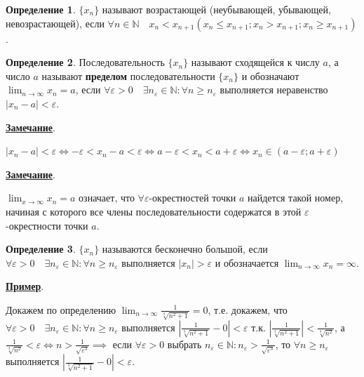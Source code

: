 \documentclass[a4paper,oneside]{article}
\newcommand{\parspace}{\vspace{10pt}}
\newcommand{\dslim}{\displaystyle\lim}
\newcommand{\dslimn}{\dslim_{n \to \infty}}
\theoremstyle{definition}
\newtheorem{definition}{Определение}[subsection]
\theoremstyle{definition}
\theoremstyle{definition}
\begin{document}
\begin{definition}
    $\{x_n\}$ называют возрастающей (неубывающей, убывающей, невозрастающей), если
    $\forall n \in \mathbb{N} \quad x_n < x_{n + 1} (x_n \le x_{n + 1}; x_n > x_{n + 1}; x_n \ge x_{n + 1})$.
\end{definition}

\begin{definition}
    Последовательность $\{x_n\}$ называют сходящейся к числу $a$, а число $a$ называют
    \textbf{пределом} последовательности $\{x_n\}$ и обозначают 
    $\displaystyle\lim_{n \rightarrow \infty} x_n = a$, если 
    $\forall \varepsilon > 0 \quad \exists n_\varepsilon \in \mathbb{N}: \forall n \ge n_\varepsilon$
    выполняется неравенство $|x_n - a| < \varepsilon$.
\end{definition}

\underline{\textbf{Замечание}}.

$|x_n - a| < \varepsilon \Leftrightarrow -\varepsilon < x_n - a < \varepsilon 
\Leftrightarrow a - \varepsilon < x_n < a + \varepsilon
\Leftrightarrow x_n \in (a - \varepsilon; a + \varepsilon)$

\parspace

\underline{\textbf{Замечание}}.

$\displaystyle\lim_{x \rightarrow \infty} x_n = a$ означает, что
$\forall \varepsilon$-окрестностей точки $a$ найдется такой номер, 
начиная с которого все члены последовательности содержатся в этой
$\varepsilon$-окрестности точки $a$.

\begin{definition}
    $\{x_n\}$ называются бесконечно большой, если
    $\forall \varepsilon > 0 \quad \exists n_\varepsilon \in \mathbb{N}:
    \forall n \ge n_\varepsilon$ выполняется $|x_n| > \varepsilon$ и
    обозначается $\dslimn x_n = \infty$.
\end{definition}

\parspace

\underline{\textbf{Пример}}.

Докажем по определению 
$\dslimn \frac{1}{\sqrt[3]{n^2 + 1}} = 0$,
т.е. докажем, что $\forall \varepsilon > 0 \quad \exists n_\varepsilon \in \mathbb{N}:
\forall n \ge n_\varepsilon$ выполняется $\left|\frac{1}{\sqrt[3]{n^2 + 1}} - 0\right| < \varepsilon$
т.к. $\left|\frac{1}{\sqrt[3]{n^2 + 1}}\right| < \frac{1}{\sqrt[3]{n^2}}$,
а $\frac{1}{\sqrt[3]{n^2}} < \varepsilon \Leftrightarrow n > \frac{1}{\sqrt{\varepsilon^3}}
\implies$ если $\forall \varepsilon > 0$ выбрать 
$n_\varepsilon \in \mathbb{N}: n_\varepsilon > \frac{1}{\sqrt{\varepsilon^3}}$,
то $\forall n \ge n_\varepsilon$ выполняется $\left|\frac{1}{\sqrt[3]{n^2 + 1}} - 0\right| < \varepsilon$.
\end{document}
